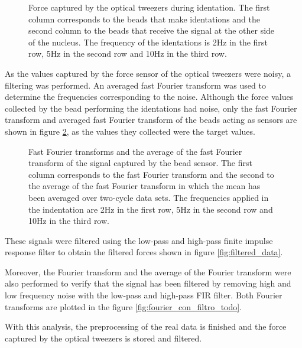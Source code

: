 \documentclass[12pt, a4paper]{article} %
\begin{document}
\setlength{\parskip}{4mm}

\begin{figure}[htbp]
  \centering
  
  \caption{Force captured by the optical tweezers during identation. The first column corresponds to the beads that make identations and the second column to the beads that receive the signal at the other side of the nucleus. The frequency of the identations is 2Hz in the first row, 5Hz in the second row and 10Hz in the third row.}
  \label{fig:raw_data}
\end{figure}

\newpage

As the values captured by the force sensor of the optical tweezers were noisy, a filtering was performed. An averaged fast Fourier transform was used to determine the frequencies corresponding to the noise. Although the force values collected by the bead performing the identations had noise, only the fast Fourier transform and averaged fast Fourier transform of the beads acting as sensors are shown in figure \ref{fig:fourier_sin_filtro}, as the values they collected were the target values. 

\begin{figure}[htbp]
  \centering
  
  \caption{Fast Fourier transforms and the average of the fast Fourier transform of the signal captured by the bead sensor. The first column corresponds to the fast Fourier transform and the second to the average of the fast Fourier transform in which the mean has been averaged over two-cycle data sets. The frequencies applied in the indentation are 2Hz in the first row, 5Hz in the second row and 10Hz in the third row.}
  \label{fig:fourier_sin_filtro}
\end{figure}

These signals were filtered using the low-pass and high-pass finite impulse response filter to obtain the filtered forces shown in figure \ref{fig:filtered_data}.

Moreover, the Fourier transform and the average of the Fourier transform were also performed to verify that the signal has been filtered by removing high and low frequency noise with the low-pass and high-pass FIR filter. Both Fourier transforms are plotted in the figure \ref{fig:fourier_con_filtro_todo}.

With this analysis, the preprocessing of the real data is finished and the force captured by the optical tweezers is stored and filtered.
\end{document}
